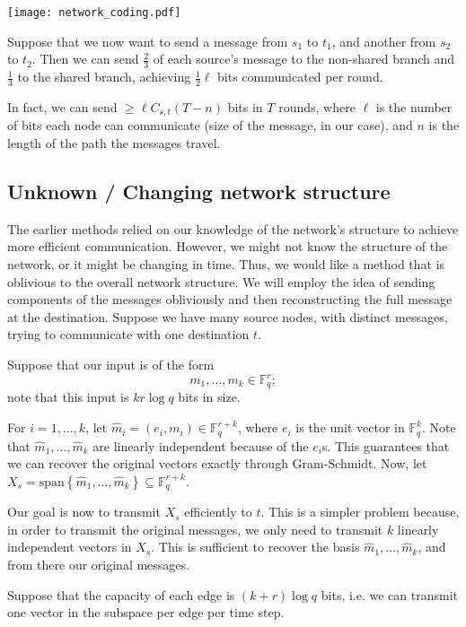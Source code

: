 \documentclass[11pt]{article}
\newcommand{\F}{\mathbb{F}}
\begin{document}
\begin{center}
\texttt{[image: network\_coding.pdf]}
\end{center}

Suppose that we now want to send a message from $s_1$ to $t_1$, and another from $s_2$ to $t_2$. Then we can send $\frac{2}{3}$ of each source's message to the non-shared branch and $\frac{1}{3}$ to the shared branch, achieving $\frac{1}{2}\ell$ bits communicated per round.

In fact, we can send $\geq \ell C_{s,t} (T - n)$ bits in $T$ rounds, where $\ell$ is the number of bits each node can communicate (size of the message, in our case), and $n$ is the length of the path the messages travel.

\subsection{Unknown / Changing network structure}

The earlier methods relied on our knowledge of the network's structure to achieve more efficient communication. However, we might not know the structure of the network, or it might be changing in time.  Thus, we would like a method that is oblivious to the overall network structure. We will employ the idea of sending components of the messages obliviously and then reconstructing the full message at the destination.  Suppose we have many source nodes, with distinct messages, trying to communicate with one destination $t$.

Suppose that our input is of the form
$$
m_1, \ldots, m_k \in \F_q^r;
$$
note that this input is $kr\log q$ bits in size.

For $i = 1,\dots,k$, let $\hat{m}_i = (e_i,m_i) \in \F_q^{r+k}$, where $e_i$ is the unit vector in $\F_q^k$. Note that $\hat{m}_1,\dots,\hat{m}_k$ are linearly independent because of the $e_i$s. This guarantees that we can recover the original vectors exactly through Gram-Schmidt. Now, let $X_s = \mathrm{span} \left\{ \hat{m}_1, \dots, \hat{m}_k \right\} \subseteq \F_q^{r+k}$.

Our goal is now to transmit $X_s$ efficiently to $t$. This is a simpler problem because, in order to transmit the original messages, we only need to transmit $k$ linearly independent vectors in $X_s$. This is sufficient to recover the basis $\hat{m}_1, \dots, \hat{m}_k$, and from there our original messages.

Suppose that the capacity of each edge is $(k+r) \log q$ bits, i.e. we can transmit one vector in the subspace per edge per time step.
\end{document}
